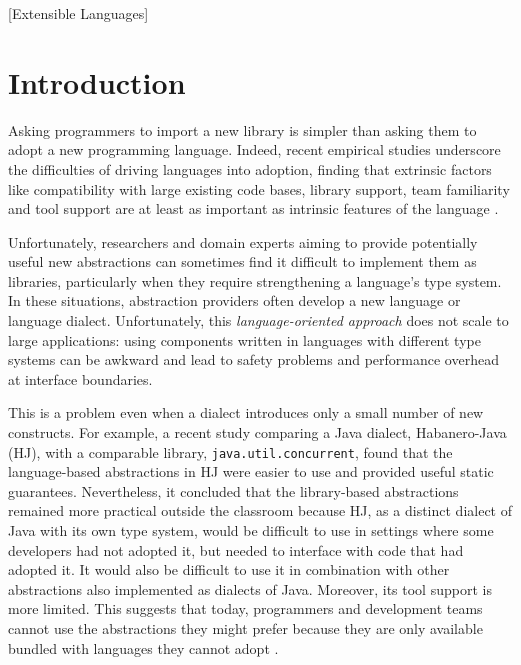 \documentclass[10pt,preprint]{sigplanconf}
\begin{document}
[Extensible Languages]
\section{Introduction}\label{intro}
Asking programmers to import a new library is simpler than asking them to adopt a new programming language. Indeed, recent empirical studies underscore the difficulties of driving languages into adoption, finding that extrinsic factors like compatibility with large existing code bases,  library support, team familiarity and tool support are at least as important as intrinsic features of the language  \cite{Meyerovich:2013:EAP:2509136.2509515,chen05,nguyen2010survey}. 

Unfortunately, researchers and domain experts aiming to provide potentially useful new abstractions can sometimes find it difficult to implement them as libraries, particularly when they require strengthening a language's type system. In these situations, abstraction providers often develop a new language or language dialect. Unfortunately, this \emph{language-oriented approach} \cite{journals/stp/Ward94} does not scale to large applications: using  components written in languages with different type systems can be awkward and lead to safety problems and performance overhead at interface boundaries. %

This is a problem even when a dialect introduces only a small number of new constructs. For example, a recent  study \cite{cave2010comparing} comparing a Java dialect, Habanero-Java (HJ), with a comparable library, \verb|java.util.concurrent|, found that the language-based abstractions in HJ were easier to use and provided useful static guarantees. Nevertheless, it concluded that the library-based abstractions remained more practical outside the classroom because HJ, as a distinct dialect of Java with its own type system, would be difficult to use in settings where some developers had not adopted it, but needed to interface with code that had adopted it. It would also be difficult to use it in combination with other abstractions also implemented as dialects of Java. Moreover, its tool support is more limited. 
This suggests that today, programmers and development teams cannot use  the abstractions they might prefer because they are only available bundled with languages they cannot adopt \cite{Meyerovich:2012:SDR:2414721.2414724,Meyerovich:2013:EAP:2509136.2509515}. 
\end{document}
